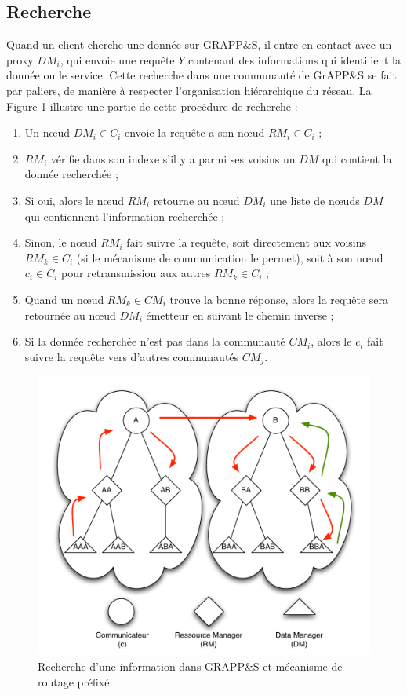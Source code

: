 \subsection{Recherche}
Quand un client cherche une donnée sur GRAPP\&S, il entre en contact avec un proxy $DM_i$, qui envoie une requête $Y$ contenant des informations qui identifient la donnée ou le service. Cette recherche dans une communauté de GrAPP\&S se fait par paliers, de manière à respecter l'organisation hiérarchique du réseau. La Figure \ref{fig:routage} illustre une partie de cette procédure de recherche : 
\begin{enumerate}
	\item Un n{\oe}ud $DM_i \in C_i$ envoie la requête a son n{\oe}ud $RM_i \in C_i$ ;
	\item $RM_i$ vérifie dans son indexe s'il y a parmi ses voisins un $DM$ qui contient la donnée recherchée ;
	\item Si oui, alors le n{\oe}ud $RM_i$ retourne au n{\oe}ud $DM_i$  une liste de n{\oe}uds $DM$ qui contiennent l'information recherchée ;
	\item Sinon, le n{\oe}ud $RM_i$ fait suivre la requête, soit directement aux voisins $RM_k \in C_i$ (si le mécanisme de communication le permet), soit à son n{\oe}ud $c_i \in C_i$ pour retransmission aux autres $RM_k \in C_i$ ;
	\item Quand un  n{\oe}ud $RM_k \in CM_i$ trouve la bonne réponse, alors la requête sera retournée au n{\oe}ud $DM_i$ émetteur en suivant le chemin inverse ;
	\item Si la donnée recherchée n'est pas dans la communauté $CM_i$, alors le $c_i$ fait suivre la requête vers d'autres communautés $CM_j$.  
\end{enumerate}

\begin{figure}
	\centering
	\includegraphics[width=0.8\linewidth]{img/Routage1.pdf} 
	\caption{Recherche d'une information dans GRAPP\&S et mécanisme de routage préfixé\label{fig:routage}}
\end{figure}

